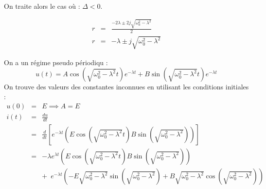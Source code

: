 On traite alors le cas où : \(\Delta <0\). \par
\begin{eqnarray*}
    r &=& \frac{-2\lambda \pm 2 j \sqrt{\omega_{\text{0}}^{2}-\lambda^{2}}}{2} \\
    r &=& -\lambda \pm j\sqrt{\omega_{\text{0}}^{2}-\lambda^{2}}
\end{eqnarray*}

On a un régime pseudo périodiqu : 
\[
    u(t) = A \cos (\sqrt{\omega_{\text{0}}^{2}-\lambda^{2}}t)e^{ -\lambda t } + B \sin ( \sqrt{\omega_{\text{0}}^{2}-\lambda^{2}} t ) e^{ -\lambda t }
\]
On trouve des valeurs des constantes inconnues en utilisant les conditions initiales : 
\begin{eqnarray*}
    u(0) &=& E \implies A = E \\
    i(t) &=& \frac{du}{dt} \\
    &=& \frac{d}{dt}\left[e^{ -\lambda t }\left(E\cos (\sqrt{\omega_{\text{0}}^{2}-\lambda^{2}} t) B\sin(\sqrt{\omega_{\text{0}}^{2}-\lambda^{2}})\right)\right] \\
    &=& -\lambda e^{ \lambda t } \left(  E\cos (\sqrt{\omega_{\text{0}}^{2}-\lambda^{2}} t) B\sin(\sqrt{\omega_{\text{0}}^{2}-\lambda^{2}})\right)  \\
    && + \, \, \, e^{ -\lambda t } \left( -E\sqrt{\omega_{\text{0}}^{2}-\lambda^{2}} \sin \left( \sqrt{\omega_{\text{0}}^{2}-\lambda^{2}} \right) + B \sqrt{\omega_{\text{0}}^{2}-\lambda^{2}} \cos \left( \sqrt{\omega_{\text{0}}^{2}-\lambda^{2}} \right)\right)
\end{eqnarray*}
